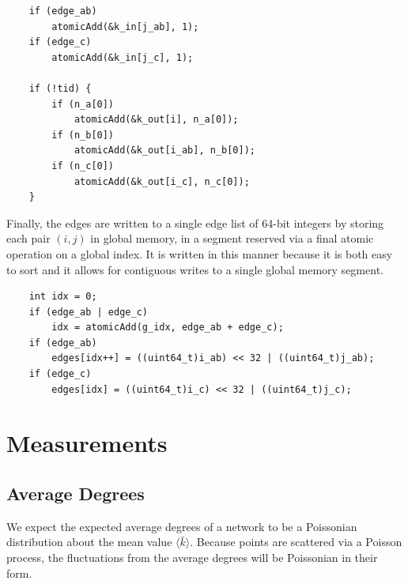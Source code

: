 \documentclass[preprint,notitlepage,amsmath,amssymb,floatfix]{revtex4-1}
\begin{document}
\begin{lstlisting}
	if (edge_ab)
		atomicAdd(&k_in[j_ab], 1);
	if (edge_c)
		atomicAdd(&k_in[j_c], 1);

	if (!tid) {
		if (n_a[0])
			atomicAdd(&k_out[i], n_a[0]);
		if (n_b[0])
			atomicAdd(&k_out[i_ab], n_b[0]);
		if (n_c[0])
			atomicAdd(&k_out[i_c], n_c[0]);
	}
\end{lstlisting}

\noindent Finally, the edges are written to a single edge list of 64-bit integers by storing each pair $(i,j)$ in global memory, in a segment reserved via a final atomic operation on a global index.  
It is written in this manner because it is both easy to sort and it allows for contiguous writes to a single global memory segment.

\begin{lstlisting}
	int idx = 0;
	if (edge_ab | edge_c)
		idx = atomicAdd(g_idx, edge_ab + edge_c);
	if (edge_ab)
		edges[idx++] = ((uint64_t)i_ab) << 32 | ((uint64_t)j_ab);
	if (edge_c)
		edges[idx] = ((uint64_t)i_c) << 32 | ((uint64_t)j_c);
\end{lstlisting}

\section{Measurements}
\subsection{Average Degrees}
We expect the expected average degrees of a network to be a Poissonian distribution about the mean value $\langle\bar{k}\rangle$.  
Because points are scattered via a Poisson process, the fluctuations from the average degrees will be Poissonian in their form.
\end{document}
